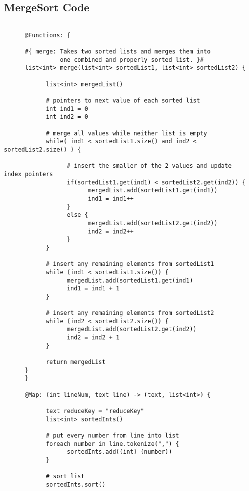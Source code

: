 \documentclass{article} \usepackage{fancyhdr, multicol}
\begin{document}
\subsection*{MergeSort Code}
\begin{verbatim}
      
      @Functions: {
	  
      #{ merge: Takes two sorted lists and merges them into
                one combined and properly sorted list. }#
      list<int> merge(list<int> sortedList1, list<int> sortedList2) {
      	  
            list<int> mergedList()
	
            # pointers to next value of each sorted list
            int ind1 = 0
            int ind2 = 0

            # merge all values while neither list is empty
            while( ind1 < sortedList1.size() and ind2 < sortedList2.size() ) {

                  # insert the smaller of the 2 values and update index pointers
                  if(sortedList1.get(ind1) < sortedList2.get(ind2)) {
                        mergedList.add(sortedList1.get(ind1))
                        ind1 = ind1++
                  }
                  else { 
                        mergedList.add(sortedList2.get(ind2))
                        ind2 = ind2++
                  }
            }
            
            # insert any remaining elements from sortedList1
            while (ind1 < sortedList1.size()) {
                  mergedList.add(sortedList1.get(ind1)
		          ind1 = ind1 + 1
		    }
		
		    # insert any remaining elements from sortedList2
            while (ind2 < sortedList2.size()) {
                  mergedList.add(sortedList2.get(ind2))
		          ind2 = ind2 + 1
		    }
	        
	        return mergedList
      }
      }
      
      @Map: (int lineNum, text line) -> (text, list<int>) {

            text reduceKey = "reduceKey"
            list<int> sortedInts()
            
            # put every number from line into list
            foreach number in line.tokenize(",") {
                  sortedInts.add((int) (number))
            }
            
            # sort list
            sortedInts.sort()
            

\end{verbatim}
\end{document}
